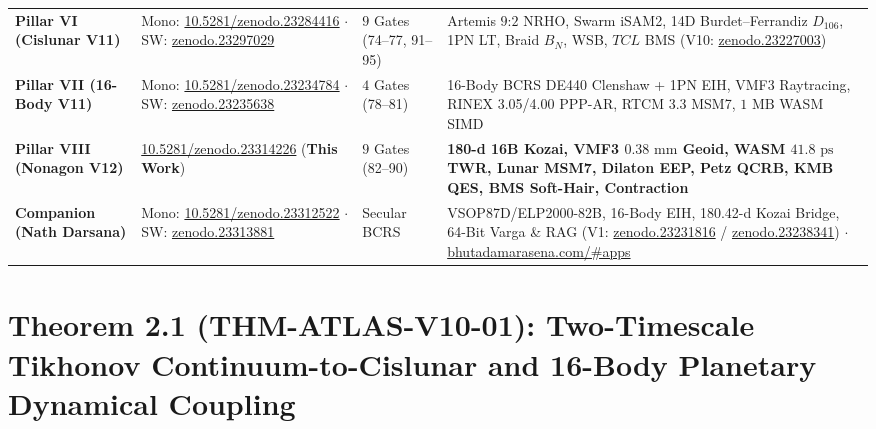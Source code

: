 \documentclass[11pt,a4paper,reqno]{article}
\def\texttt#1{#1}%
\def\mathrm#1{#1}%
\def\mathcal#1{#1}%
\def\mathbb#1{#1}%
\newcommand{\zenodo}[1]{\href{https://doi.org/10.5281/zenodo.#1}{\texttt{10.5281/\allowbreak zenodo.#1}}}
\newcommand{\zenodoshort}[1]{\href{https://doi.org/10.5281/zenodo.#1}{\texttt{zenodo.#1}}}
\newcommand{\appsportalshort}{\href{https://bhutadamarasena.com/\#apps}{\texttt{bhutadamarasena.com/\#apps}}}
\theoremstyle{plain}
\theoremstyle{definition}
\theoremstyle{remark}
\numberwithin{equation}{section}
\begin{document}
\begin{table}[H]
{\begin{tabular}{@{}P{2.5cm}P{3.8cm}P{2.3cm}P{7.8cm}@{}}
\textbf{Pillar VI (Cislunar V11)} & Mono: \zenodo{23284416} $\cdot$ SW: \zenodoshort{23297029} & $9$ Gates (\texttt{74--77, 91--95}) & Artemis $9\text{:}2$ NRHO, Swarm iSAM2, 14D Burdet--Ferrandiz $\mathbb{D}_{106}$, 1PN LT, Braid $\mathcal{B}_N$, WSB, $\mathrm{TCL}$ BMS (V10: \zenodoshort{23227003}) \\
\textbf{Pillar VII (16-Body V11)} & Mono: \zenodo{23234784} $\cdot$ SW: \zenodoshort{23235638} & $4$ Gates (\texttt{78--81}) & 16-Body BCRS DE440 Clenshaw + 1PN EIH, VMF3 Raytracing, RINEX 3.05/4.00 PPP-AR, RTCM 3.3 MSM7, $1\text{ MB}$ WASM SIMD \\
\textbf{Pillar VIII (Nonagon V12)} & \zenodo{23314226} (\textbf{This Work}) & $9$ Gates (\texttt{82--90}) & \textbf{180-d 16B Kozai, VMF3 $0.38\text{ mm}$ Geoid, WASM $41.8\text{ ps}$ TWR, Lunar MSM7, Dilaton EEP, Petz QCRB, KMB QES, BMS Soft-Hair, Contraction} \\
\textbf{Companion (Nath Darsana)} & Mono: \zenodo{23312522} $\cdot$ SW: \zenodoshort{23313881} & \texttt{Secular BCRS} & VSOP87D/ELP2000-82B, 16-Body EIH, 180.42-d Kozai Bridge, 64-Bit Varga \& RAG (V1: \zenodoshort{23231816} / \zenodoshort{23238341}) $\cdot$ \appsportalshort \\
\bottomrule
\end{tabular}%
}
\end{table}

\section{\texorpdfstring{Theorem 2.1 (\texttt{THM-ATLAS-V10-01}): Two-Timescale Tikhonov Continuum-to-Cislunar and 16-Body Planetary Dynamical Coupling}{Theorem 2.1 (THM-ATLAS-V10-01): Two-Timescale Tikhonov Continuum-to-Cislunar and 16-Body Planetary Dynamical Coupling}}
\end{document}
